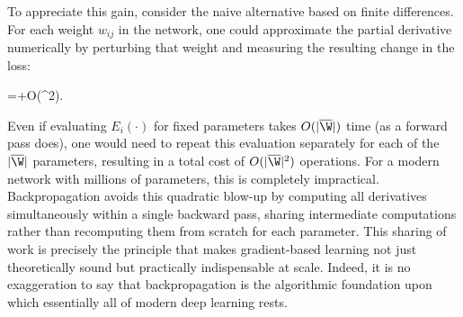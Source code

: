 To appreciate this gain, consider the naive alternative based on finite differences. For each weight $w_{ij}$ in the network, one could approximate the partial derivative numerically by perturbing that weight and measuring the resulting change in the loss:
\begin{myequation}
=+O(\varepsilon^2).
\end{myequation}
Even if evaluating $E_i(\cdot)$ for fixed parameters takes $O(|\overline\W|)$ time (as a forward pass does), one would need to repeat this evaluation separately for each of the $|\overline\W|$ parameters, resulting in a total cost of $O(|\overline\W|^2)$ operations. For a modern network with millions of parameters, this is completely impractical. Backpropagation avoids this quadratic blow-up by computing all derivatives simultaneously within a single backward pass, sharing intermediate computations rather than recomputing them from scratch for each parameter. This sharing of work is precisely the principle that makes gradient-based learning not just theoretically sound but practically indispensable at scale. Indeed, it is no exaggeration to say that backpropagation is the algorithmic foundation upon which essentially all of modern deep learning rests.

%
%

